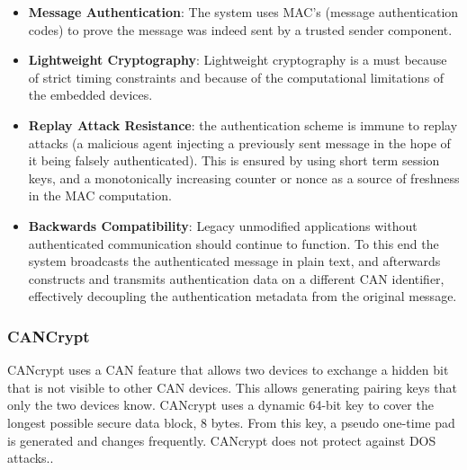 \documentclass[11pt]{article}
\begin{document}
\begin{itemize}
	\item \textbf{Message Authentication}: The system uses MAC’s (message authentication codes) to prove the message was indeed sent by a trusted sender component.\cite{VulCAN}
	
	\item \textbf{Lightweight Cryptography}: Lightweight cryptography is a must because of strict timing constraints and because of the computational limitations of the embedded devices.\cite{VulCAN}
	
	\item \textbf{Replay Attack Resistance}: the authentication scheme is immune to replay attacks (a malicious agent injecting a previously sent message in the hope of it being falsely authenticated). This is ensured by using short term session keys, and a monotonically increasing counter or nonce as a source of freshness in the MAC computation.\cite{VulCAN}
	
	\item \textbf{Backwards Compatibility}: Legacy unmodified applications without authenticated communication should continue to function. To this end the system broadcasts the authenticated message in plain text, and afterwards constructs and transmits authentication data on a different CAN identifier, effectively decoupling the authentication metadata from the original message.\cite{VulCAN}
\end{itemize}

\subsubsection{CANCrypt} CANcrypt uses a CAN feature that allows two devices to exchange a hidden bit that is not visible to other CAN devices. This allows generating pairing keys that only the two devices know. CANcrypt uses a dynamic 64-bit key to cover the longest possible secure data block, 8 bytes. From this key, a pseudo one-time pad is generated and changes frequently. CANcrypt does not protect against DOS attacks.\cite{Pfeiffer}.
\end{document}
